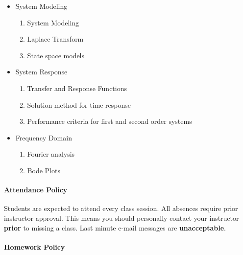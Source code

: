 \documentclass[11pt, reqno]{article}   	%
\begin{document}
\begin{itemize}
    \item System Modeling
        \begin{enumerate}
            \item System Modeling
            \item Laplace Transform
            \item State space models
        \end{enumerate}
  
    \item System Response
        \begin{enumerate}
            \item Transfer and Response Functions
            \item Solution method for time response
            \item Performance criteria for first and second order systems
        \end{enumerate}
    \item Frequency Domain
        \begin{enumerate}
            \item Fourier analysis
            \item Bode Plots
        \end{enumerate}
\end{itemize}

\paragraph{Attendance Policy} 
Students are expected to attend every class session.
All absences require prior instructor approval.
This means you should personally contact your instructor \textbf{prior} to missing a class.
Last minute e-mail messages are \textbf{unacceptable}.

\paragraph{Homework Policy}
\end{document}
